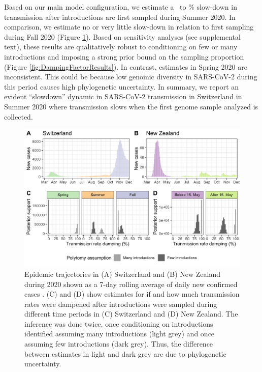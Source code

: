 \documentclass[9pt,twoside,lineno]{pnas-new} %
\begin{document}
Based on our main model configuration, we estimate a \summermaxdampingpercentmedianCHEnosampUB\ to \summermindampingpercentmedianCHEnosampUB\% slow-down in transmission after introductions are first sampled during Summer 2020. In comparison, we estimate no or very little slow-down in relation to first sampling during Fall 2020 (Figure \ref{fig:scale-factor}). Based on sensitivity analyses (see supplemental text), these results are qualitatively robust to conditioning on few or many introductions and imposing a strong prior bound on the sampling proportion (Figure \ref{fig:DampingFactorResults}). In contrast, estimates in Spring 2020 are inconsistent. This could be because low genomic diversity in SARS-CoV-2 during this period causes high phylogenetic uncertainty. In summary, we report an evident ``slowdown'' dynamic in SARS-CoV-2 transmission in Switzerland in Summer 2020 where transmission slows when the first genome sample analyzed is collected.

\begin{figure}[h!]
\centering
\includegraphics[width=0.75\linewidth]{figures/contact_tracing_factors_no_sampUB_compared_to_cases.png}
\caption{Epidemic trajectories in (A) Switzerland and (B) New Zealand during 2020 shown as a 7-day rolling average of daily new confirmed cases \cite{Appel}. (C) and (D) show estimates for if and how much transmission rates were dampened after introductions were sampled during different time periods in (C) Switzerland and (D) New Zealand. The inference was done twice, once conditioning on introductions identified assuming many introductions (light grey) and once assuming few introductions (dark grey). Thus, the difference between estimates in light and dark grey are due to phylogenetic uncertainty.}  
\label{fig:scale-factor}
\end{figure}
\end{document}
